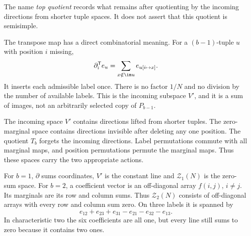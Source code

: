 The name \emph{top quotient} records what remains after quotienting
by the incoming directions from shorter tuple spaces. It does not
assert that this quotient is semisimple.

The transpose map has a direct combinatorial meaning. For a
$(b-1)$-tuple $u$ with position $i$ missing,
\[
 \partial_i^{\mathsf T}e_u
       =\sum_{x\notin\im u} e_{u[i\mapsto x]}.
\]
It inserts each admissible label once. There is no factor $1/N$ and
no division by the number of available labels. This is the incoming
subspace $V'$, and it is a sum of images, not an arbitrarily selected
copy of $P_{b-1}$.

The incoming space $V'$ contains directions lifted from shorter tuples. The zero-marginal space contains directions invisible after deleting any one position. The quotient $T_b$ forgets the incoming directions. Label permutations commute with all marginal maps, and position permutations permute the marginal maps. Thus these spaces carry the two appropriate actions.

\begin{example}
For $b=1$, $\partial$ sums coordinates, $V'$ is the constant line and $\mathcal Z_1(N)$ is the zero-sum space. For $b=2$, a coefficient vector is an off-diagonal array $f(i,j)$, $i\ne j$. Its marginals are its row and column sums. Thus $\mathcal Z_2(N)$ consists of off-diagonal arrays with every row and column sum zero. On three labels it is spanned by
\[e_{12}+e_{23}+e_{31}-e_{21}-e_{32}-e_{13}.
\]
In characteristic two the six coefficients are all one, but every line still sums to zero because it contains two ones.
\end{example}

